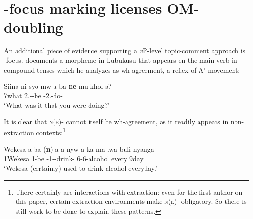 \documentclass[output=paper]{langscibook}
\begin{document}


\section{\Ne{}-focus marking licenses OM-doubling} \label{SectNeFocusMarker}

An additional piece of evidence supporting a \textit{v}P-level topic-comment approach is \Ne-focus. \citet[335]{Wasike:2007:Thesis} documents a morpheme in Lubukusu that appears on the main verb in compound tenses which he analyzes as wh-agreement, a reflex of A'-movement: 

\ea 
\gll Siina ni-syo mw-a-ba \textbf{ne}-mu-khol-a? \\
7what  2\Pl.\Sm-\Pst-be \textbf{\Ne}-2\Pl.\Sm-do-\Fv{} \\
\glt `What was it that you were doing?'
\z 

\noindent It is clear that \textsc{n(e)-} cannot itself be wh-agreement, as it readily appears in non-extraction contexts:\footnote{There certainly are interactions with extraction: even for the first author on this paper, certain extraction environments make \textsc{n(e)-} obligatory. So there is still work to be done to explain these patterns.} 

\begin{exe}
\ex 


 \label{CtNePresent}
\gll Wekesa a-ba (\textbf{n})-a-a-nyw-a ka-ma-lwa buli nyanga \\
1Wekesa 1-be \textbf{\Ne}-1\Sm-\Pst-drink-\Fv{} 6-6-alcohol every 9day \\
\glt `Wekesa (certainly) used to drink alcohol everyday.' \\

\end{exe}
\end{document}
